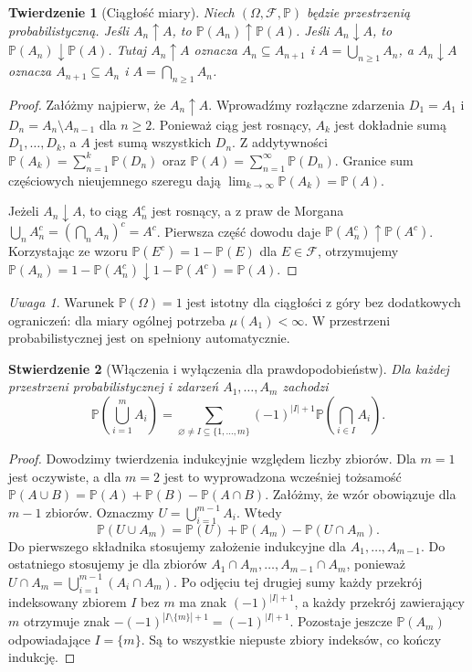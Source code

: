 \documentclass[11pt,a4paper,oneside]{report}
\numberwithin{equation}{chapter}
\theoremstyle{plain}
\newtheorem{twierdzenie}{Twierdzenie}[chapter]
\newtheorem{stwierdzenie}[twierdzenie]{Stwierdzenie}
\theoremstyle{definition}
\theoremstyle{remark}
\newtheorem{uwaga}{Uwaga}[chapter]
\newcommand{\Prob}{\mathbb{P}}
\begin{document}
\begin{twierdzenie}[Ciągłość miary]
Niech $(\Omega,\mathcal F,\Prob)$ będzie przestrzenią probabilistyczną.
Jeśli $A_n\uparrow A$, to $\Prob(A_n)\uparrow\Prob(A)$.
Jeśli $A_n\downarrow A$, to $\Prob(A_n)\downarrow\Prob(A)$.
Tutaj $A_n\uparrow A$ oznacza $A_n\subseteq A_{n+1}$ i
$A=\bigcup_{n\geq1}A_n$, a $A_n\downarrow A$ oznacza
$A_{n+1}\subseteq A_n$ i $A=\bigcap_{n\geq1}A_n$.
\end{twierdzenie}
\begin{proof}
Załóżmy najpierw, że $A_n\uparrow A$.
Wprowadźmy rozłączne zdarzenia
$D_1=A_1$ i $D_n=A_n\setminus A_{n-1}$ dla $n\geq2$.
Ponieważ ciąg jest rosnący, $A_k$ jest dokładnie sumą
$D_1,\ldots,D_k$, a $A$ jest sumą wszystkich $D_n$.
Z addytywności
$\Prob(A_k)=\sum_{n=1}^k\Prob(D_n)$ oraz
$\Prob(A)=\sum_{n=1}^\infty\Prob(D_n)$.
Granice sum częściowych nieujemnego szeregu dają
$\lim_{k\to\infty}\Prob(A_k)=\Prob(A)$.

Jeżeli $A_n\downarrow A$, to ciąg $A_n^c$ jest rosnący,
a z praw de Morgana
$\bigcup_n A_n^c=(\bigcap_n A_n)^c=A^c$.
Pierwsza część dowodu daje
$\Prob(A_n^c)\uparrow\Prob(A^c)$. Korzystając ze wzoru
$\Prob(E^c)=1-\Prob(E)$ dla $E\in\mathcal F$,
otrzymujemy
$\Prob(A_n)=1-\Prob(A_n^c)\downarrow1-\Prob(A^c)
=\Prob(A)$.
\end{proof}

\begin{uwaga}
Warunek $\Prob(\Omega)=1$ jest istotny dla ciągłości z góry
bez dodatkowych ograniczeń: dla miary ogólnej potrzeba
$\mu(A_1)<\infty$. W przestrzeni probabilistycznej jest on
spełniony automatycznie.
\end{uwaga}

\begin{stwierdzenie}[Włączenia i wyłączenia dla prawdopodobieństw]
Dla każdej przestrzeni probabilistycznej i zdarzeń $A_1,\ldots,A_m$
zachodzi
\[
\Prob\!\left(\bigcup_{i=1}^m A_i\right)
=\sum_{\varnothing\ne I\subseteq\{1,\ldots,m\}}
(-1)^{|I|+1}\Prob\!\left(\bigcap_{i\in I}A_i\right).
\]
\end{stwierdzenie}
\begin{proof}
Dowodzimy twierdzenia indukcyjnie względem liczby zbiorów.
Dla $m=1$ jest oczywiste, a dla $m=2$ jest to
wyprowadzona wcześniej tożsamość
$\Prob(A\cup B)=\Prob(A)+\Prob(B)-\Prob(A\cap B)$.
Załóżmy, że wzór obowiązuje dla $m-1$ zbiorów.
Oznaczmy $U=\bigcup_{i=1}^{m-1}A_i$. Wtedy
\[
\Prob(U\cup A_m)
=\Prob(U)+\Prob(A_m)-\Prob(U\cap A_m).
\]
Do pierwszego składnika stosujemy założenie indukcyjne
dla $A_1,\ldots,A_{m-1}$. Do ostatniego stosujemy
je dla zbiorów $A_1\cap A_m,\ldots,A_{m-1}\cap A_m$,
ponieważ
$U\cap A_m=\bigcup_{i=1}^{m-1}(A_i\cap A_m)$.
Po odjęciu tej drugiej sumy każdy przekrój indeksowany
zbiorem $I$ bez $m$ ma znak $(-1)^{|I|+1}$,
a każdy przekrój zawierający $m$ otrzymuje znak
$-(-1)^{|I\setminus\{m\}|+1}=(-1)^{|I|+1}$.
Pozostaje jeszcze $\Prob(A_m)$ odpowiadające $I=\{m\}$.
Są to wszystkie niepuste zbiory indeksów, co kończy indukcję.
\end{proof}
\end{document}
